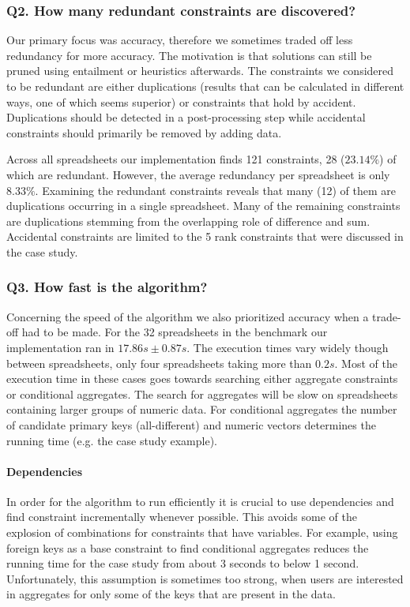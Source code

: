\documentclass{ecai}
\begin{document}
\subsubsection*{Q2. How many redundant constraints are discovered?}
Our primary focus was accuracy, therefore we sometimes traded off less redundancy for more accuracy.
The motivation is that solutions can still be pruned using entailment or heuristics afterwards.
The constraints we considered to be redundant are either duplications (results that can be calculated in different ways, one of which seems superior) or constraints that hold by accident.
Duplications should be detected in a post-processing step while accidental constraints should primarily be removed by adding data.

Across all spreadsheets our implementation finds 121 constraints, 28 ($23.14\%$) of which are redundant.
However, the average redundancy per spreadsheet is only $8.33\%$.
Examining the redundant constraints reveals that many (12) of them are duplications occurring in a single spreadsheet.
Many of the remaining constraints are duplications stemming from the overlapping role of difference and sum.
Accidental constraints are limited to the 5 rank constraints that were discussed in the case study.

\subsubsection*{Q3. How fast is the algorithm?}
Concerning the speed of the algorithm we also prioritized accuracy when a trade-off had to be made.
For the 32 spreadsheets in the benchmark our implementation ran in $17.86s \pm 0.87s$.
The execution times vary widely though between spreadsheets, only four spreadsheets taking more than $0.2s$.
Most of the execution time in these cases goes towards searching either aggregate constraints or conditional aggregates.
The search for aggregates will be slow on spreadsheets containing larger groups of numeric data.
For conditional aggregates the number of candidate primary keys (all-different) and numeric vectors determines the running time (e.g. the case study example).

\paragraph{Dependencies}
In order for the algorithm to run efficiently it is crucial to use dependencies and find constraint incrementally whenever possible.
This avoids some of the explosion of combinations for constraints that have variables.
For example, using foreign keys as a base constraint to find conditional aggregates reduces the running time for the case study from about 3 seconds to below 1 second.
Unfortunately, this assumption is sometimes too strong, when users are interested in aggregates for only some of the keys that are present in the data.
\end{document}
